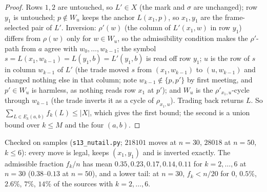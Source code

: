 \begin{proof}
Rows $1,2$ are untouched, so $L'\in X$ (the mark and $\sigma$ are unchanged); row $y_1$ is
untouched; $p\notin W_u$ keeps the anchor $L(x_1,p)$, so $x_1,y_1$ are the frame-selected
pair of $L'$.  Inversion: $\rho'(w)$ (the column of $L'(x_1,w)$ in row $y_1$) differs from
$\rho(w)$ only for $w\in W_u$, so the admissibility condition makes the $\rho'$-path from
$a$ agree with $w_0,\dots,w_{k-1}$; the symbol $s=L(x_1,w_{k-1})=L(y_1,b)=L'(y_1,b)$ is read
off row $y_1$; $u$ is the row of $s$ in column $w_{k-1}$ of $L'$ (the trade moved $s$ from
$(x_1,w_{k-1})$ to $(u,w_{k-1})$ and changed nothing else in that column; note
$w_{k-1}\notin\{p,p'\}$ by first meeting, and $p'\in W_u$ is harmless, as nothing reads row
$x_1$ at $p'$); and
$W_u$ is the $\rho'_{x_1,u}$-cycle through $w_{k-1}$ (the trade inverts it as a cycle of
$\rho_{x_1,u}$).  Trading back returns $L$.  So
$\sum_{L\in E_k(a,b)}f_k(L)\le|X|$, which gives the first bound; the second is a union bound over
$k\le M$ and the four $(a,b)$.
\end{proof}

Checked on samples (\texttt{s13\_nutail.py}; $218101$ moves at $n=30$,
$28018$ at $n=50$, $k\le6$): every move is legal, keeps $(x_1,y_1)$ and
is inverted exactly.  The admissible fraction $f_k/n$ has mean
$0.35,0.23,0.17,0.14,0.11$ for $k=2,\dots,6$ at $n=30$ ($0.38$--$0.13$ at
$n=50$), and a lower tail: at $n=30$, $f_k<n/20$ for $0$, $0.5\%$, $2.6\%$,
$7\%$, $14\%$ of the sources with $k=2,\dots,6$.

